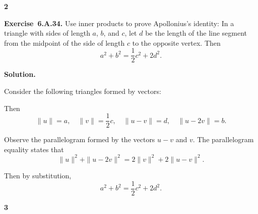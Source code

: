 \documentclass[11pt]{article}
\newcommand{\ProblemDivider}[1]{%
  \vspace{1.0em}
  \noindent\textbf{#1}\par
  \vspace{0.35em}
}
\newcommand{\ProblemAnnounce}{\noindent}
\newcommand{\SolutionAnnounce}{\noindent\textbf{Solution.}\par\medskip}
\newcommand{\Exercise}[1]{\textbf{Exercise~#1.}\;}
\newcommand{\<}{\langle}
\renewcommand{\>}{\rangle}
\begin{document}
\ProblemDivider{2}

\begin{problemBox}
\ProblemAnnounce
\Exercise{6.A.34}
Use inner products to prove Apollonius's identity: In a triangle with
sides of length $a$, $b$, and $c$, let $d$ be the length of the line segment from the midpoint of
the side of length $c$ to the opposite vertex. Then
\[a^2 + b^2 = \frac{1}{2}c^2 + 2d^2.\]
\end{problemBox}

\begin{solutionBox}
\SolutionAnnounce
\doublespacing

Consider the following triangles formed by vectors:

\begin{center}
\end{center}

Then
\[\|u\| = a,\quad \|v\| = \frac{1}{2}c,\quad \|u-v\| = d,\quad \|u-2v\| = b.\]

Observe the parallelogram formed by the vectors $u-v$ and $v$. The parallelogram equality
states that
\[\|u\|^2 + \|u-2v\|^2 = 2\|v\|^2 + 2\|u-v\|^2.\]

Then by substitution,
\[a^2 + b^2 = \frac{1}{2}c^2 + 2d^2.\]
\end{solutionBox}
\newpage

\ProblemDivider{3}
\end{document}
